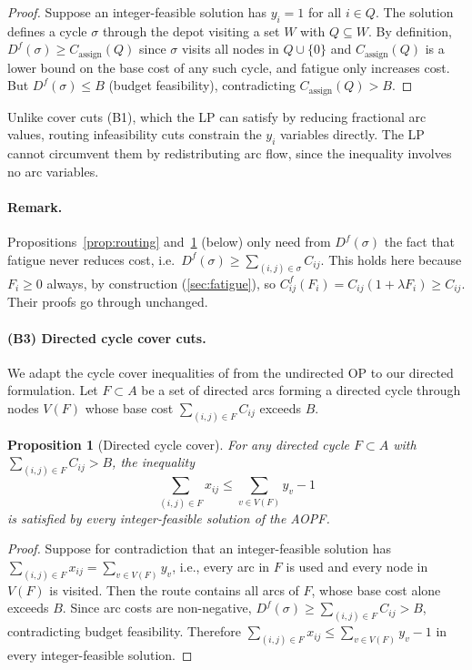 \documentclass[11pt,a4paper]{article}
\newtheorem{proposition}{Proposition}
\begin{document}
\begin{proof}
Suppose an integer-feasible solution has $y_i = 1$ for all $i \in Q$.
The solution defines a cycle $\sigma$ through the depot visiting a set $W$ with $Q \subseteq W$.
By definition, $D^f(\sigma) \geq C_{\text{assign}}(Q)$ since $\sigma$ visits all nodes in $Q \cup \{0\}$ and $C_{\text{assign}}(Q)$ is a lower bound on the base cost of any such cycle, and fatigue only increases cost.
But $D^f(\sigma) \leq B$ (budget feasibility), contradicting $C_{\text{assign}}(Q) > B$.
\end{proof}

Unlike cover cuts (B1), which the LP can satisfy by reducing fractional arc values, routing infeasibility cuts constrain the $y_i$ variables directly.
The LP cannot circumvent them by redistributing arc flow, since the inequality involves no arc variables.

\paragraph{Remark.}
Propositions~\ref{prop:routing} and~\ref{prop:cyclecover} (below) only need from $D^f(\sigma)$ the fact that fatigue never reduces cost, i.e.\ $D^f(\sigma) \geq \sum_{(i,j) \in \sigma} C_{ij}$.
This holds here because $F_i \geq 0$ always, by construction (\cref{sec:fatigue}), so $C^f_{ij}(F_i) = C_{ij}(1 + \lambda F_i) \geq C_{ij}$.
Their proofs go through unchanged.

\paragraph{(B3) Directed cycle cover cuts.}
We adapt the cycle cover inequalities of \citet{fischetti1998solving} from the undirected OP to our directed formulation.
Let $F \subset A$ be a set of directed arcs forming a directed cycle through nodes $V(F)$ whose base cost $\sum_{(i,j) \in F} C_{ij}$ exceeds $B$.

\begin{proposition}[Directed cycle cover]
\label{prop:cyclecover}
For any directed cycle $F \subset A$ with $\sum_{(i,j) \in F} C_{ij} > B$, the inequality
\begin{equation}
  \sum_{(i,j) \in F} x_{ij} \leq \sum_{v \in V(F)} y_v - 1
  \label{eq:cycle_cover}
\end{equation}
is satisfied by every integer-feasible solution of the AOPF\@.
\end{proposition}

\begin{proof}
Suppose for contradiction that an integer-feasible solution has $\sum_{(i,j) \in F} x_{ij} = \sum_{v \in V(F)} y_v$, i.e., every arc in $F$ is used and every node in $V(F)$ is visited.
Then the route contains all arcs of $F$, whose base cost alone exceeds $B$.
Since arc costs are non-negative, $D^f(\sigma) \geq \sum_{(i,j) \in F} C_{ij} > B$, contradicting budget feasibility.
Therefore $\sum_{(i,j) \in F} x_{ij} \leq \sum_{v \in V(F)} y_v - 1$ in every integer-feasible solution.
\end{proof}
\end{document}
